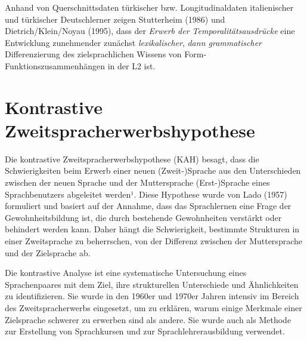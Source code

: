 \documentclass[
  letterpaper,
]{scrbook}
\begin{document}
\begin{tcolorbox}[enhanced jigsaw, arc=.35mm, left=2mm, bottomrule=.15mm, toprule=.15mm, colframe=quarto-callout-note-color-frame, breakable, rightrule=.15mm, opacityback=0, colback=white, leftrule=.75mm]
\begin{minipage}[t]{5.5mm}
\textcolor{quarto-callout-note-color}{\faInfo}
\end{minipage}%
\begin{minipage}[t]{\textwidth - 5.5mm}

Anhand von Querschnittsdaten türkischer bzw. Longitudinaldaten
italienischer und türkischer Deutschlerner zeigen Stutterheim (1986) und
Dietrich/Klein/Noyau (1995), dass der \emph{Erwerb der
Temporalitätsausdrücke} eine Entwicklung zunehmender zunächst
\emph{lexikalischer}, \emph{dann grammatischer} Differenzierung des
zielsprachlichen Wissens von Form-Funktionszusammenhängen in der L2 ist.

\end{minipage}%
\end{tcolorbox}

\hypertarget{kontrastive-zweitspracherwerbshypothese}{%
\section{Kontrastive
Zweitspracherwerbshypothese}\label{kontrastive-zweitspracherwerbshypothese}}

Die kontrastive Zweitspracherwerbshypothese (KAH) besagt, dass die
Schwierigkeiten beim Erwerb einer neuen (Zweit-)Sprache aus den
Unterschieden zwischen der neuen Sprache und der Muttersprache
(Erst-)Sprache eines Sprachbenutzers abgeleitet werden¹. Diese Hypothese
wurde von Lado (1957) formuliert und basiert auf der Annahme, dass das
Sprachlernen eine Frage der Gewohnheitsbildung ist, die durch bestehende
Gewohnheiten verstärkt oder behindert werden kann. Daher hängt die
Schwierigkeit, bestimmte Strukturen in einer Zweitsprache zu
beherrschen, von der Differenz zwischen der Muttersprache und der
Zielsprache ab.

Die kontrastive Analyse ist eine systematische Untersuchung eines
Sprachenpaares mit dem Ziel, ihre strukturellen Unterschiede und
Ähnlichkeiten zu identifizieren. Sie wurde in den 1960er und 1970er
Jahren intensiv im Bereich des Zweitspracherwerbs eingesetzt, um zu
erklären, warum einige Merkmale einer Zielsprache schwerer zu erwerben
sind als andere. Sie wurde auch als Methode zur Erstellung von
Sprachkursen und zur Sprachlehrerausbildung verwendet.
\end{document}

